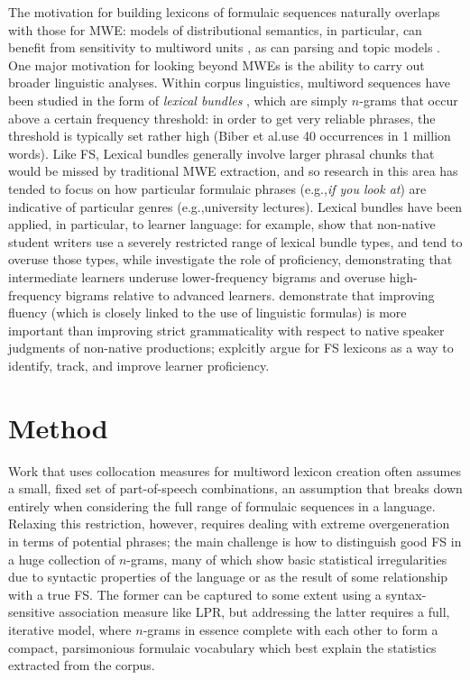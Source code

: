 \documentclass[11pt,letterpaper]{article}
\makeatletter
\def \eg {e.g.,\@ }
\def \al {al.\@ }
\makeatother
\begin{document}
The motivation for building lexicons of formulaic sequences naturally overlaps with those for MWE: models of distributional semantics, in particular, can benefit from sensitivity to multiword units \cite{Cohen:Widdows:2009}, as can parsing \cite{Constant16} and topic models \cite{Lau+:2012b}. One major motivation for looking beyond MWEs is the ability to carry out broader linguistic analyses. Within corpus linguistics, multiword sequences have been studied in the form of \textit{lexical bundles} \cite{Biber04}, which are simply $n$-grams that occur above a certain frequency threshold: in order to get very reliable phrases, the threshold is typically set rather high (Biber et \al use 40 occurrences in 1 million words). Like FS, Lexical bundles generally involve larger phrasal chunks that would be missed by traditional MWE extraction, and so research in this area has tended to focus on how particular formulaic phrases (\eg \textit{if you look at}) are indicative of particular genres (\eg university lectures). Lexical bundles have been applied, in particular, to learner language: for example,   show that non-native student writers use a severely restricted range of lexical bundle types, and tend to overuse those types, while  investigate the role of proficiency, demonstrating that intermediate learners underuse lower-frequency bigrams and overuse high-frequency bigrams relative to advanced learners.  demonstrate that improving fluency (which is closely linked to the use of linguistic formulas) is more important than improving strict grammaticality with respect to native speaker judgments of non-native productions;  explcitly argue for FS lexicons as a way to identify, track, and improve learner proficiency.




\section{Method}

Work that uses collocation measures for multiword lexicon creation often assumes a small, fixed set of part-of-speech combinations, an assumption that breaks down entirely when considering the full range of formulaic sequences in a language. Relaxing this restriction, however, requires dealing with extreme overgeneration in terms of potential phrases; the main challenge is how to distinguish good FS in a huge collection of $n$-grams, many of which show basic statistical irregularities due to syntactic properties of the language or as the result of some relationship with a true FS. The former can be captured to some extent using a syntax-sensitive association measure like LPR, but addressing the latter requires a full, iterative model, where $n$-grams in essence complete with each other to form a compact, parsimonious formulaic vocabulary which best explain the statistics extracted from the corpus.
\end{document}
